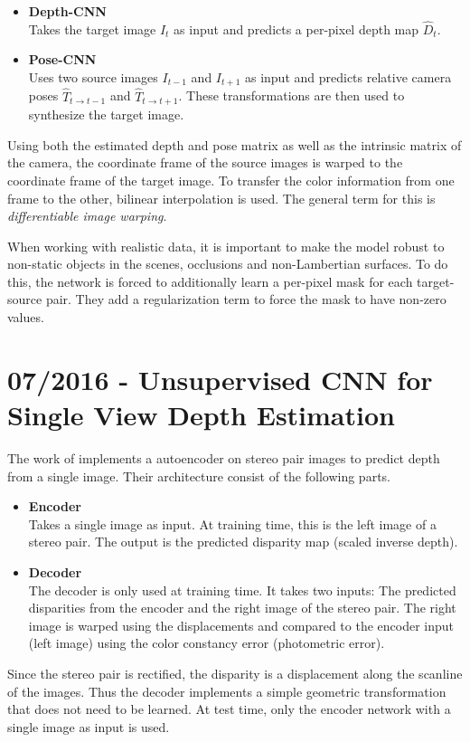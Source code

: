 		\begin{itemize}
			\item \textbf{Depth-CNN}
				\\
				Takes the target image $I_t$ as input and predicts a per-pixel depth map $\hat{D}_t$.
			\item \textbf{Pose-CNN}
				\\
				Uses two source images $I_{t - 1}$ and $I_{t + 1}$ as input and predicts relative camera poses $\hat{T}_{t \rightarrow t - 1}$ and $\hat{T}_{t \rightarrow t + 1}$. 
				These transformations are then used to synthesize the target image.
		\end{itemize}
		Using both the estimated depth and pose matrix as well as the intrinsic matrix of the camera, the coordinate frame of the source images is warped to the coordinate frame of the target image.
		To transfer the color information from one frame to the other, bilinear interpolation is used.
		The general term for this is \emph{differentiable image warping}.
		
		When working with realistic data, it is important to make the model robust to non-static objects in the scenes, occlusions and non-Lambertian surfaces.
		To do this, the network is forced to additionally learn a per-pixel mask for each target-source pair.
		They add a regularization term to force the mask to have non-zero values.
		
		
	\section{07/2016 - Unsupervised CNN for Single View Depth Estimation}
	
		The work of \cite{garg2016} implements a autoencoder on stereo pair images to predict depth from a single image.
		Their architecture consist of the following parts.
		\begin{itemize}
			\item \textbf{Encoder}
				\\
				Takes a single image as input. 
				At training time, this is the left image of a stereo pair.
				The output is the predicted disparity map (scaled inverse depth).
			\item \textbf{Decoder}
				\\
				The decoder is only used at training time.
				It takes two inputs: The predicted disparities from the encoder and the right image of the stereo pair.
				The right image is warped using the displacements and compared to the encoder input (left image) using the color constancy error (photometric error).
		\end{itemize}
		Since the stereo pair is rectified, the disparity is a displacement along the scanline of the images.
		Thus the decoder implements a simple geometric transformation that does not need to be learned.
		At test time, only the encoder network with a single image as input is used.
		
